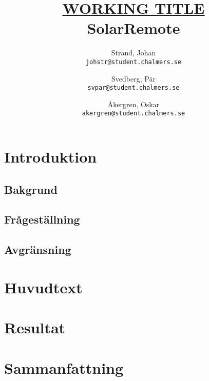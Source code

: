 \documentclass{article}
\author{	Strand, Johan \\ \texttt{johstr@student.chalmers.se} \and
			Svedberg, Pär\\ \texttt{svpar@student.chalmers.se} \and
			Åkergren, Oskar\\ \texttt{akergren@student.chalmers.se}
}
\title{\underline{\small{WORKING TITLE}} \\ SolarRemote}
\begin{document}
	\maketitle
	\thispagestyle{empty}

	\newpage 
	\section{Introduktion} %
	\label{sec:introduktion}

		\subsection{Bakgrund} %
		\label{sub:bakgrund}


		\subsection{Frågeställning} %
		\label{sub:fragestallning}
		

		\subsection{Avgränsning} %
		\label{sub:avgransning}
		
	\section{Huvudtext} %
	\label{sec:huvudtext}


	\section{Resultat} %
	\label{sec:resultat}


	\section{Sammanfattning} %
	\label{sec:sammanfattning}




	\printbibliography		
\end{document}
